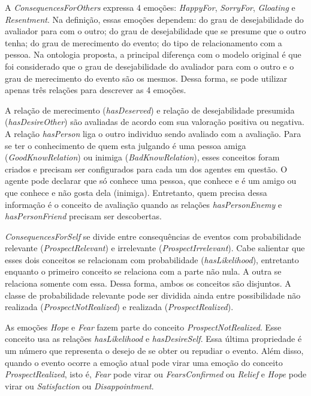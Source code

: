 A \emph{ConsequencesForOthers} expressa 4 emoções: \emph{HappyFor},
\emph{SorryFor}, \emph{Gloating} e \emph{Resentment}. Na definição, essas
emoções dependem: do grau de desejabilidade do avaliador para com o outro; do
grau de desejabilidade que se presume que o outro tenha; do grau de
merecimento do evento; do tipo de relacionamento com a pessoa. Na ontologia
proposta, a principal diferença com o modelo original é que foi considerado
que o grau de desejabilidade do avaliador para com o outro e o grau de
merecimento do evento são os mesmos. Dessa forma, se pode utilizar apenas três
relações para descrever as 4 emoções.

A relação de merecimento (\emph{hasDeserved}) e relação de desejabilidade
presumida (\emph{hasDesireOther}) são avaliadas de acordo com sua valoração
positiva ou negativa. A relação \emph{hasPerson} liga o outro individuo
sendo avaliado com a avaliação. Para se ter o conhecimento de quem esta
julgando é uma pessoa amiga (\emph{GoodKnowRelation}) ou inimiga
(\emph{BadKnowRelation}), esses conceitos foram criados e precisam ser
configurados para cada um dos agentes em questão. O agente pode declarar que
só conhece uma pessoa, que conhece e é um amigo ou que conhece e não gosta
dela (inimiga). Entretanto, quem precisa dessa informação é o conceito de
avaliação quando as relações \emph{hasPersonEnemy} e \emph{hasPersonFriend}
precisam ser descobertas.

\emph{ConsequencesForSelf} se divide entre consequências de eventos com
probabilidade relevante (\emph{ProspectRelevant}) e irrelevante
(\emph{ProspectIrrelevant}). Cabe salientar que esses dois conceitos se
relacionam com probabilidade (\emph{hasLikelihood}), entretanto enquanto o
primeiro conceito se relaciona com a parte não nula. A outra se relaciona
somente com essa. Dessa forma, ambos os conceitos são disjuntos. A classe de
probabilidade relevante pode ser dividida ainda entre possibilidade não
realizada (\emph{ProspectNotRealized}) e realizada (\emph{ProspectRealized}).

As emoções \emph{Hope} e \emph{Fear} fazem parte do conceito
\emph{ProspectNotRealized}. Esse conceito usa as relações \emph{hasLikelihood}
e \emph{hasDesireSelf}. Essa última propriedade é um número que
representa o desejo de se obter ou repudiar o evento. Além disso, quando o
evento ocorre a emoção atual pode virar uma emoção do conceito
\emph{ProspectRealized}, isto é, \emph{Fear} pode virar ou
\emph{FearsConfirmed} ou \emph{Relief} e \emph{Hope} pode virar ou
\emph{Satisfaction} ou \emph{Disappointment}.

